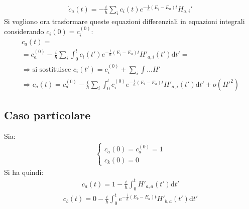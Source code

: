 \begin{equation}\begin{split}
\dot c_a\left(t\right)=-\frac{i}{\hbar }\sum_i{c_i\left(t\right)e^{-\frac{i}{\hbar }\left(E_i-E_a\right)t}H_{a,i}'}
\end{split}\end{equation}
Si vogliono ora trasformare queste equazioni differenziali in equazioni integrali considerando $c_i\left(0\right)=c_i^{\left(0\right)}$:
\begin{equation}\begin{split}
c_a\left(t\right)=\\
=c_a^{\left(0\right)}-\frac{i}{\hbar }\sum_i{\int_0^t{c_i\left(t'\right)e^{-\frac{i}{\hbar }\left(E_i-E_a\right)t}H'_{a,i}\left(t'\right)\textrm{d}t'}}=\\
\Longrightarrow \textrm{si sostituisce }c_i\left(t'\right)=c_i^{\left(0\right)}+\sum_i{\int{\dots H'}}\\
\Longrightarrow c_a\left(t\right)=c_a^{\left(0\right)}-\frac{i}{\hbar }\sum_i{\int_0^t{c_i^{\left(0\right)}e^{-\frac{i}{\hbar }\left(E_i-E_a\right)t}H'_{a,i}\left(t'\right)\textrm{d}t'}}+o\left(H'^2\right)
\end{split}\end{equation}

\subsection{Caso particolare} %
Sia:
\begin{equation}\begin{split}
\begin{cases}
c_a\left(0\right)=c_a^{\left(0\right)}=1 \\
c_k\left(0\right)=0
\end{cases}
\end{split}\end{equation}
Si ha quindi:
\begin{equation}\begin{split}
c_a\left(t\right)=1-\frac{i}{\hbar }\int_0^t{H'_{a,a}\left(t'\right)\textrm{d}t'}
\end{split}\end{equation}
\begin{equation}\begin{split}
c_b\left(t\right)=0-\frac{i}{\hbar }\int_0^t{e^{-\frac{i}{\hbar }\left(E_b-E_a\right)t}H'_{b,a}\left(t'\right)\textrm{d}t'}
\end{split}\end{equation}

